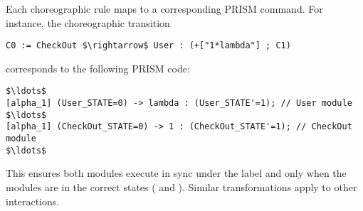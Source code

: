 Each choreographic rule maps to a corresponding PRISM command. For instance, the choreographic transition 
\begin{lstlisting}[style=chor-color,frame=none,escapechar=|]
C0 := CheckOut $\rightarrow$ User : (+["1*lambda"] ; C1)
\end{lstlisting}
corresponds to the following PRISM code:
\begin{lstlisting}[style=prism-color,frame=none,escapechar=|]
$\ldots$
[alpha_1] (User_STATE=0) -> lambda : (User_STATE'=1); // User module
$\ldots$
[alpha_1] (CheckOut_STATE=0) -> 1 : (CheckOut_STATE'=1); // CheckOut module
$\ldots$
\end{lstlisting}
 This ensures both modules execute in sync under the label  and only when the modules are in the correct states ( and ). Similar transformations apply to other interactions.



